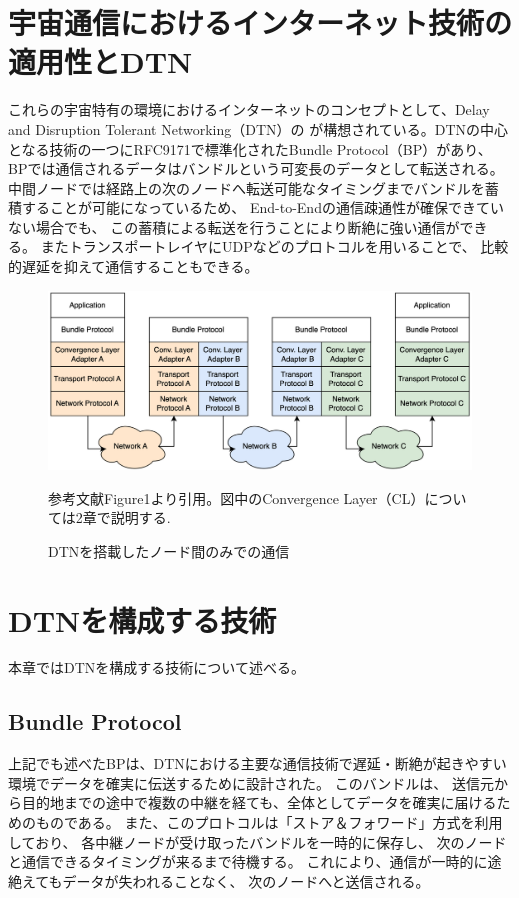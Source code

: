\section{宇宙通信におけるインターネット技術の適用性とDTN}
これらの宇宙特有の環境におけるインターネットのコンセプトとして、Delay and Disruption Tolerant Networking（DTN）の
が構想されている。DTNの中心となる技術の一つにRFC9171\cite{rfc9171}で標準化されたBundle Protocol（BP）があり、 
BPでは通信されるデータはバンドルという可変長のデータとして転送される。 
中間ノードでは経路上の次のノードへ転送可能なタイミングまでバンドルを蓄積することが可能になっているため、 
End-to-Endの通信疎通性が確保できていない場合でも、 この蓄積による転送を行うことにより断絶に強い通信ができる。
またトランスポートレイヤにUDPなどのプロトコルを用いることで、 比較的遅延を抑えて通信することもできる。

\cite{bundle_protocol_architecture}

\begin{figure}[tbh]
    \centering
    \includegraphics[width=0.7\textheight]{img/dtnprotocolstack.pdf}
    \caption{DTNを搭載したノード間のみでの通信}
    \label{fig:dtnprotocolstack}
    \begin{minipage}{\textwidth}
        \raggedright
        参考文献\cite{bundle_protocol_architecture}Figure1より引用。図中のConvergence Layer（CL）については2章で説明する.
    \end{minipage}
\end{figure}

\section{DTNを構成する技術}
\label{section:DTNを構成する技術}
本章ではDTNを構成する技術について述べる。


\subsection{Bundle Protocol}
\label{subsection:Bundle Protocol}
上記でも述べたBPは、DTNにおける主要な通信技術で遅延・断絶が起きやすい環境でデータを確実に伝送するために設計された。
このバンドルは、 送信元から目的地までの途中で複数の中継を経ても、全体としてデータを確実に届けるためのものである。 
また、このプロトコルは「ストア＆フォワード」方式を利用しており、 各中継ノードが受け取ったバンドルを一時的に保存し、 
次のノードと通信できるタイミングが来るまで待機する。 これにより、通信が一時的に途絶えてもデータが失われることなく、 次のノードへと送信される。

